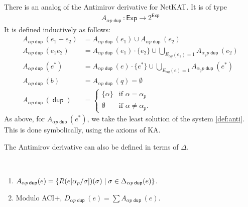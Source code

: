 \documentclass{article}
\newcommand\ssum{\mathop{\textstyle\sum}}
\newcommand\pdup{\mathop{\mathsf{dup}}}
\newcommand\Exp{\mathsf{Exp}}
\renewcommand\star{^{\textstyle *}}
\renewcommand\powerset[1]{2^{#1}}
\newcommand\STD{\Delta}
\newcommand\Anti{A}
\begin{document}
There is an analog of the Antimirov derivative for NetKAT. It is of type
\begin{align*}
\Anti_{\alpha p\pdup} : \Exp\to\powerset\Exp
\end{align*}
It is defined inductively as follows:
\begin{align}
\Anti_{\alpha p\pdup}(e_1+e_2) &= \Anti_{\alpha p\pdup}(e_1) \cup \Anti_{\alpha p\pdup}(e_2)\nonumber\\
\Anti_{\alpha p\pdup}(e_1e_2) &= \Anti_{\alpha p\pdup}(e_1)\cdot\{e_2\} \cup \bigcup_{E_{\alpha q}(e_1)=1}\Anti_{\alpha_q p\pdup}(e_2)\nonumber\\
\Anti_{\alpha p\pdup}(e\star) &= \Anti_{\alpha p\pdup}(e)\cdot\{e\star\} \cup \bigcup_{E_{\alpha q}(e)=1}\Anti_{\alpha_q p\pdup}(e\star)\label{def:anti}\\
\Anti_{\alpha p\pdup}(b) &= \Anti_{\alpha p\pdup}(q) = \emptyset\nonumber\\
\Anti_{\alpha p\pdup}(\pdup) &= \begin{cases}
\{\alpha\} & \text{if $\alpha=\alpha_p$}\\
\emptyset & \text{if $\alpha\neq\alpha_p$.}
\end{cases}\nonumber
\end{align}
As above, for $\Anti_{\alpha p\pdup}(e\star)$, we take the least solution of the system \eqref{def:anti}.
This is done symbolically, using the axioms of KA.

The Antimirov derivative can also be defined in terms of $\STD$.

\begin{lemma}
\label{eq:DDelta}\ 
\begin{enumerate}[{\upshape (i)}]
\item
$\Anti_{\alpha p\pdup}(e) = \set{\rep\sigma{e\subst{\alpha_p}\sigma}}{\sigma\in\STD_{\alpha p\pdup}(e)}$.
\item
Modulo ACI+, $D_{\alpha p\pdup}(e) = \ssum\Anti_{\alpha p\pdup}(e)$.
\end{enumerate}
\end{lemma}
\end{document}
